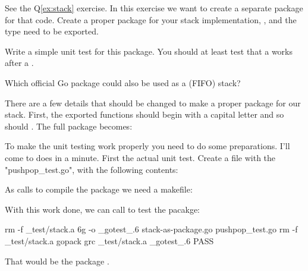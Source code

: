 \begin{Exercise}[title={Stack as package},difficulty=2]
\label{ex:stack-package}
\Question\label{ex:stack-package q1} 
See the Q\ref{ex:stack} exercise. In this exercise we want to create
a separate package for that code.
Create a proper package for your
stack implementation, ,  and the  type need to be
exported.

\Question\label{ex:stack-package q2} Write a simple unit test for this package.
You should at least test that a  works after a .

\Question\label{ex:stack-package q3} Which official Go package could
also be used as a (FIFO) stack?
\end{Exercise}

\begin{Answer}
\Question There are a few details that should be changed to make a proper package
for our stack. First, the exported functions should begin with a capital 
letter and so should . The full package becomes:


\Question To make the unit testing work properly you need to do some
preparations. I'll come to does in a minute. First the actual unit test.
Create a file with the "pushpop\_test.go", with the following contents:

As  calls  to compile the package we need a makefile:

With this work done, we can call  to test the pacakge:
\begin{display}
\pr {}
rm -f _test/stack.a
6g  -o _gotest_.6 stack-as-package.go  pushpop_test.go
rm -f _test/stack.a
gopack grc _test/stack.a _gotest_.6 
PASS
\end{display}

\Question That would be the package .
\end{Answer}
